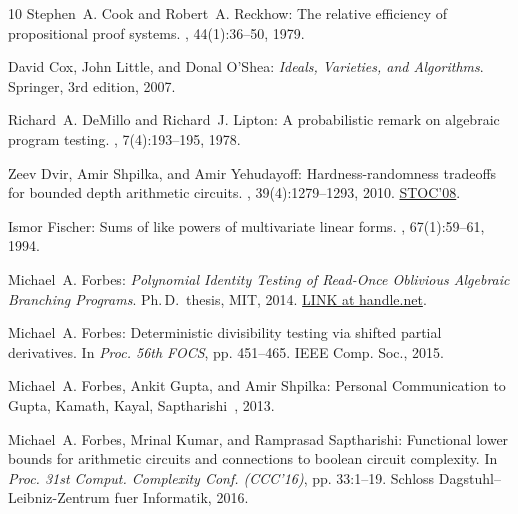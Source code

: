 \documentclass[11pt]{article}
\numberwithin{equation}{section}
\theoremstyle{definition}
\theoremstyle{plain}
\begin{document}
\begin{thebibliography}{10}
{\sc Stephen~A. Cook and Robert~A. Reckhow}: The relative efficiency of
  propositional proof systems.
, 44(1):36--50, 1979.
\newblock [\epfmtdoi{10.2307/2273702}]

{\sc David Cox, John Little, and Donal O'Shea}: {\em Ideals, Varieties, and
  Algorithms}.
\newblock Springer, 3rd edition, 2007.
\newblock [\epfmtdoi{10.1007/978-3-319-16721-3}]

{\sc Richard~A. DeMillo and Richard~J. Lipton}: A probabilistic remark on
  algebraic program testing.
, 7(4):193--195, 1978.
\newblock [\epfmtdoi{10.1016/0020-0190(78)90067-4}]

{\sc Zeev Dvir, Amir Shpilka, and Amir Yehudayoff}: Hardness-randomness
  tradeoffs for bounded depth arithmetic circuits.
, 39(4):1279--1293, 2010.
\newblock \prelim \href{https://doi.org/10.1145/1374376.1374482}{STOC'08}.
\newblock [\epfmtdoi{10.1137/080735850}]

{\sc Ismor Fischer}: Sums of like powers of multivariate linear forms.
, 67(1):59--61, 1994.
\newblock [\epfmtdoi{10.1080/0025570X.1994.11996185}]

{\sc Michael~A. Forbes}: {\em Polynomial Identity Testing of Read-Once
  Oblivious Algebraic Branching Programs}.
\newblock Ph.\,D.\ thesis, MIT, 2014.
\newblock \href{http://hdl.handle.net/1721.1/89843}{LINK at handle.net}.

{\sc Michael~A. Forbes}: Deterministic divisibility testing via shifted partial
  derivatives.
\newblock In {\em Proc. 56th FOCS}, pp. 451--465. IEEE Comp. Soc., 2015.

{\sc Michael~A. Forbes, Ankit Gupta, and Amir Shpilka}: Personal Communication
  to Gupta, Kamath, Kayal, Saptharishi~\cite{GuptaKKS13b}, 2013.

{\sc Michael~A. Forbes, Mrinal Kumar, and Ramprasad Saptharishi}: Functional
  lower bounds for arithmetic circuits and connections to boolean circuit
  complexity.
\newblock In {\em Proc. 31st Comput. Complexity Conf. (CCC'16)}, pp. 33:1--19.
  Schloss Dagstuhl--Leibniz-Zentrum fuer Informatik, 2016.


\end{thebibliography}
\end{document}

